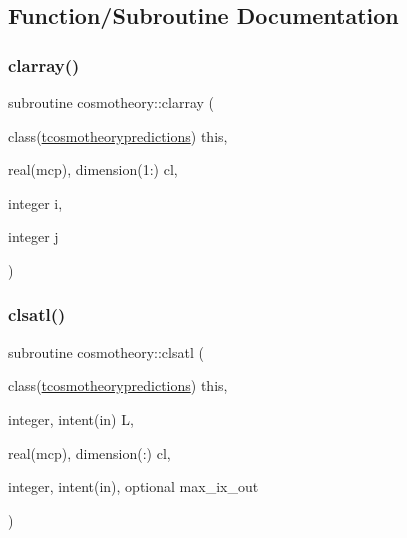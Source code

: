 \subsection{Function/\+Subroutine Documentation}
\mbox{\label{namespacecosmotheory_a605ce5a8433255f2dffd34cc83381994}} 
\subsubsection{\texorpdfstring{clarray()}{clarray()}}
{\footnotesize\ttfamily subroutine cosmotheory\+::clarray (\begin{DoxyParamCaption}\item[{class(\mbox{\hyperlink{structcosmotheory_1_1tcosmotheorypredictions}{tcosmotheorypredictions}})}]{this,  }\item[{real(mcp), dimension(1\+:)}]{cl,  }\item[{integer}]{i,  }\item[{integer}]{j }\end{DoxyParamCaption})\hspace{0.3cm}{\ttfamily [private]}}

\mbox{\label{namespacecosmotheory_a98c26fbec9089b69336f49452bf55c94}} 
\subsubsection{\texorpdfstring{clsatl()}{clsatl()}}
{\footnotesize\ttfamily subroutine cosmotheory\+::clsatl (\begin{DoxyParamCaption}\item[{class(\mbox{\hyperlink{structcosmotheory_1_1tcosmotheorypredictions}{tcosmotheorypredictions}})}]{this,  }\item[{integer, intent(in)}]{L,  }\item[{real(mcp), dimension(\+:)}]{cl,  }\item[{integer, intent(in), optional}]{max\+\_\+ix\+\_\+out }\end{DoxyParamCaption})\hspace{0.3cm}{\ttfamily [private]}}

\mbox{\label{namespacecosmotheory_a9f04a404c1ca817b4a8ff9046f85bea6}} 
